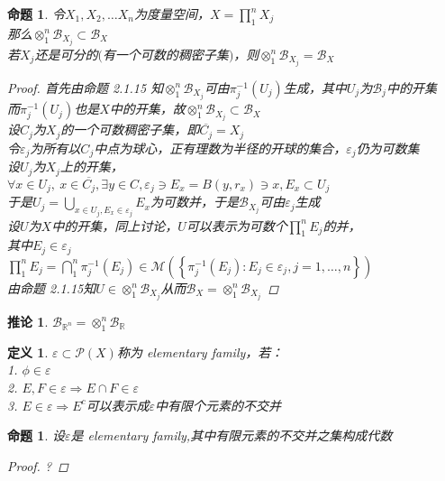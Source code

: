 \documentclass[12pt, a4paper, oneside]{ctexbook}
\newtheorem{definition}[theorem]{定义}
\newtheorem{corollary}[theorem]{推论}
\newtheorem{proposition}[theorem]{命题}
\begin{document}
\begin{proposition}
    令$X_1,X_2,\dots X_n$为度量空间，$X=\prod_1^n X_j$\\
    那么$\otimes_1^n\mathcal{B}_{X_j}\subset\mathcal{B}_X$\\
    若$X_j$还是可分的$($有一个可数的稠密子集$)$，则$\otimes_1^n\mathcal{B}_{X_j}=\mathcal{B}_X$
    \begin{proof}
        首先由命题 2.1.15 知$\otimes_1^n\mathcal{B}_{X_j}$可由$\pi_{j}^{-1}(U_j)$生成，其中$U_j$为$\mathcal{B}_j$中的开集\\
        而$\pi_j^{-1}(U_j)$也是$X$中的开集，故$\otimes_1^n\mathcal{B}_{X_j}\subset\mathcal{B}_{X}$\\
        设$C_j$为$X_j$的一个可数稠密子集，即$\overline{C_j}=X_j$\\
        令$\varepsilon_j$为所有以$C_j$中点为球心，正有理数为半径的开球的集合，$\varepsilon_j$仍为可数集\\
        设$U_j$为$X_j$上的开集，\\
        $\forall x\in U_j,\ x\in\overline{C_j},\exists y\in C,\varepsilon_j\ni E_x=B(y,r_x)\ni x,E_x\subset U_j$\\
        于是$U_j=\bigcup_{x\in U_j,E_x\in\varepsilon_j}E_x$为可数并，于是$\mathcal{B}_{X_j}$可由$\varepsilon_j$生成\\
        设$U$为$X$中的开集，同上讨论，$U$可以表示为可数个$\prod_1^nE_j$的并，\\
        其中$E_j\in\varepsilon_j$\\
        $\prod_1^nE_j=\bigcap_1^n\pi_j^{-1}(E_j)\in\mathcal{M}(\left\{\pi_j^{-1}(E_j):E_j\in\varepsilon_j,j=1,\dots,n\right\})$\\
        由命题 2.1.15知$U\in\otimes_1^n\mathcal{B}_{X_j}$从而$\mathcal{B}_{X}=\otimes_1^n\mathcal{B}_{X_j}$
    \end{proof}
\end{proposition}
\begin{corollary}
    $\mathcal{B}_{\mathbb{R}^n}=\otimes_1^n\mathcal{B}_{\mathbb{R}}$
\end{corollary}
\begin{definition}
    $\varepsilon\subset\mathcal{P}(X)$称为 elementary family，若：\\
    1. $\phi\in\varepsilon$\\
    2. $E,F\in\varepsilon\Rightarrow E\cap F\in\varepsilon$\\
    3. $E\in\varepsilon\Rightarrow E^c$可以表示成$\varepsilon$中有限个元素的不交并
\end{definition}
\begin{proposition}
    设$\varepsilon$是 elementary family,其中有限元素的不交并之集构成代数
    \begin{proof}
        ?
    \end{proof}
\end{proposition}
\end{document}
